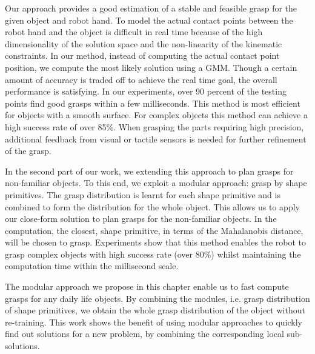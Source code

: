 Our approach provides a good estimation of a stable and feasible grasp for the given object and robot hand. To model the actual contact points between the robot hand and the object is difficult in real time because of the high dimensionality of the solution space and the non-linearity of the kinematic constraints. In our method, instead of computing the actual contact point position, we compute the most likely solution using a GMM. Though a certain amount of accuracy is traded off to achieve the real time goal, the overall performance is satisfying. In our experiments, over 90 percent of the testing points find good grasps within a few milliseconds. This method is most efficient for objects with a smooth surface. For complex objects this method can achieve a high success rate of over 85\%. When grasping the parts requiring high precision, additional feedback from visual or tactile sensors is needed for further refinement of the grasp.

In the second part of our work, we extending this approach to plan grasps for non-familiar objects.
To this end, we exploit a modular approach: grasp by shape primitives. The grasp distribution is learnt for each shape primitive and is combined to form the distribution for the whole object. This allows us to apply our close-form solution to plan grasps for the non-familiar objects. In the computation, the closest, shape primitive, in terms of the Mahalanobis distance, will be chosen to grasp.
Experiments show that this method enables the robot to grasp complex objects with high success rate (over 80\%) whilst maintaining the computation time within the millisecond scale.

The modular approach we propose in this chapter enable us to fast compute grasps for any daily life objects. By combining the modules, i.e. grasp distribution of shape primitives, we obtain the whole grasp distribution of the object without re-training. This work shows the benefit of using modular approaches to quickly find out solutions for a new problem, by combining the corresponding local sub-solutions.

